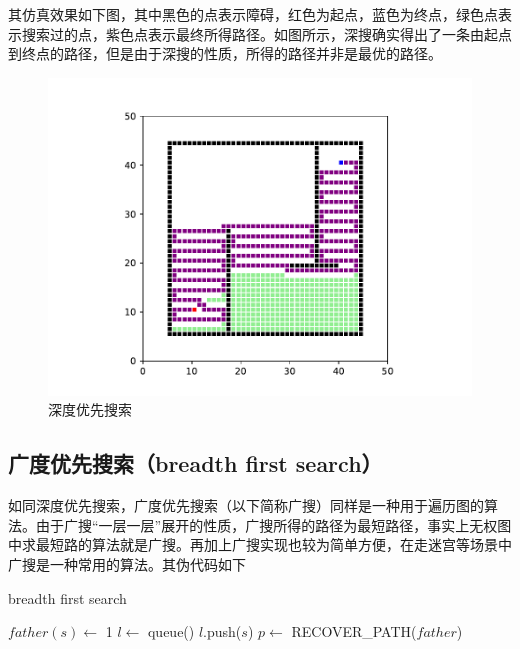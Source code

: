 \documentclass[12pt]{article}
\begin{document}
    \pagebreak
    其仿真效果如下图，其中黑色的点表示障碍，红色为起点，蓝色为终点，绿色点表示搜索过的点，紫色点表示最终所得路径。如图所示，深搜确实得出了一条由起点到终点的路径，但是由于深搜的性质，所得的路径并非是最优的路径。

    \begin{figure}[h]
        \centering
        \includegraphics[scale=0.7]{fig/dfs.pdf}
        \caption{深度优先搜索}
    \end{figure}
    \pagebreak
    \subsection{广度优先搜索（breadth first search）}
    如同深度优先搜索，广度优先搜索（以下简称广搜）同样是一种用于遍历图的算法。由于广搜“一层一层”展开的性质，广搜所得的路径为最短路径，事实上无权图中求最短路的算法就是广搜。再加上广搜实现也较为简单方便，在走迷宫等场景中广搜是一种常用的算法。其伪代码如下
    
    \begin{algorithm}[H]
        \caption{breadth first search}
        $father(s)\gets$ 1 \;
        $l \gets$ queue()\;
        $l$.push($s$)\;
        $p \gets $ RECOVER\_PATH($father$)\;
    \end{algorithm}
\end{document}
